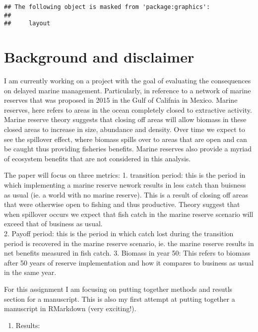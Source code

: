 \documentclass[
]{article}
\providecommand{\tightlist}{%
  \setlength{\itemsep}{0pt}\setlength{\parskip}{0pt}}
\begin{document}
\begin{verbatim}
## The following object is masked from 'package:graphics':
## 
##     layout
\end{verbatim}

\hypertarget{background-and-disclaimer}{%
\section{Background and disclaimer}\label{background-and-disclaimer}}

I am currently working on a project with the goal of evaluating the
consequences on delayed marine management. Particularly, in reference to
a network of marine reserves that was proposed in 2015 in the Gulf of
Califnia in Mexico. Marine reserves, here refers to areas in the ocean
completely closed to extractive activity. Marine reserve theory suggests
that closing off areas will allow biomass in these closed areas to
increase in size, abundance and density. Over time we expect to see the
spillover effect, where biomass spills over to areas that are open and
can be caught thus providing fisheries benefits. Marine reserves also
provide a myriad of ecosystem benefits that are not considered in this
analysis.

The paper will focus on three metrics: 1. transition period: this is the
period in which implementing a marine reserve nework results in less
catch than buisness as usual (ie. a world with no marine reserve). This
is a result of closing off areas that were otherwise open to fishing and
thus productive. Theory suggest that when spillover occurs we expect
that fish catch in the marine reserve scenario will exceed that of
business as usual.\\
2. Payoff period: this is the period in which catch lost during the
transition period is recovered in the marine reserve scenario, ie. the
marine reserve results in net benefits measured in fish catch. 3.
Biomass in year 50: This refers to biomass after 50 years of reserve
implementation and how it compares to business as usual in the same
year.

For this assignment I am focusing on putting together methods and
resutls section for a manuscript. This is also my first attempt at
putting together a manuscript in RMarkdown (very exciting!).

\begin{enumerate}
\def\labelenumi{\arabic{enumi}.}
\tightlist
\item
  Results:
\end{enumerate}
\end{document}
